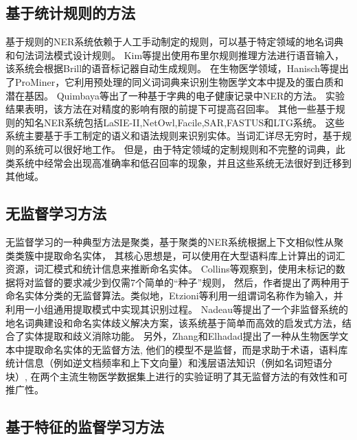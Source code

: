 \subsection{基于统计规则的方法}

基于规则的NER系统依赖于人工手动制定的规则，可以基于特定领域的地名词典和句法词法模式设计规则。
Kim等提出使用布里尔规则推理方法进行语音输入，该系统会根据Brill的语音标记器自动生成规则\cite{kim2000rule}。
在生物医学领域，Hanisch等提出了ProMiner，它利用预处理的同义词词典来识别生物医学文本中提及的蛋白质和潜在基因\cite{hanisch2005prominer}。 
Quimbaya等出了一种基于字典的电子健康记录中NER的方法\cite{pomares2016named}。
实验结果表明，该方法在对精度的影响有限的前提下可提高召回率。
其他一些基于规则的知名NER系统包括LaSIE-II,NetOwl,Facile,SAR,FASTUS和LTG系统。
这些系统主要基于手工制定的语义和语法规则来识别实体。当词汇详尽无穷时，基于规则的系统可以很好地工作。
但是，由于特定领域的定制规则和不完整的词典，此类系统中经常会出现高准确率和低召回率的现象，并且这些系统无法很好到迁移到其他域。

\subsection{无监督学习方法}

无监督学习的一种典型方法是聚类，基于聚类的NER系统根据上下文相似性从聚类类簇中提取命名实体，
其核心思想是，可以使用在大型语料库上计算出的词汇资源，词汇模式和统计信息来推断命名实体。 
Collins等观察到，使用未标记的数据将对监督的要求减少到仅需7个简单的“种子”规则\cite{collins1999unsupervised}，
然后，作者提出了两种用于命名实体分类的无监督算法。类似地，Etzioni等利用一组谓词名称作为输入，并利用一小组通用提取模式中实现其识别过程\cite{etzioni2005unsupervised}。 
Nadeau等提出了一个非监督系统的地名词典建设和命名实体歧义解决方案，该系统基于简单而高效的启发式方法，结合了实体提取和歧义消除功能\cite{nadeau2006unsupervised}。
另外，Zhang和Elhadad提出了一种从生物医学文本中提取命名实体的无监督方法\cite{zhang2013unsupervised},
他们的模型不是监督，而是求助于术语，语料库统计信息（例如逆文档频率和上下文向量）和浅层语法知识（例如名词短语分块）,
在两个主流生物医学数据集上进行的实验证明了其无监督方法的有效性和可推广性。

\subsection{基于特征的监督学习方法}


